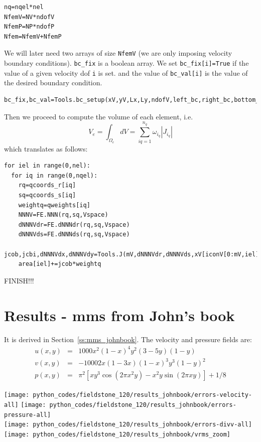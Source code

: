 \begin{lstlisting}
nq=nqel*nel
NfemV=NV*ndofV
NfemP=NP*ndofP
Nfem=NfemV+NfemP
\end{lstlisting}

We will later need two arrays of size \lstinline{NfemV} (we are only imposing
velocity boundary conditions). \lstinline{bc_fix} is a boolean array.
We set \lstinline{bc_fix[i]=True} if the value of a given velocity dof \lstinline{i} is set. 
and the value of \lstinline{bc_val[i]} is the value of the desired boundary condition.

\begin{lstlisting}
bc_fix,bc_val=Tools.bc_setup(xV,yV,Lx,Ly,ndofV,left_bc,right_bc,bottom_bc,top_bc)
\end{lstlisting}

Then we proceed to compute the volume of each element, i.e. 
\[
V_e = \int_{\Omega_e} dV = \sum_{iq=1}^{n_q} \omega_{i_q} |J_{i_q}|
\]
which translates as follows: 
\begin{lstlisting}
for iel in range(0,nel):
  for iq in range(0,nqel):
    rq=qcoords_r[iq]
    sq=qcoords_s[iq]
    weightq=qweights[iq]
    NNNV=FE.NNN(rq,sq,Vspace)
    dNNNVdr=FE.dNNNdr(rq,sq,Vspace)
    dNNNVds=FE.dNNNds(rq,sq,Vspace)
    jcob,jcbi,dNNNVdx,dNNNVdy=Tools.J(mV,dNNNVdr,dNNNVds,xV[iconV[0:mV,iel]],yV[iconV[0:mV,iel]])
    area[iel]+=jcob*weightq
\end{lstlisting}

FINISH!!!


\newpage
\section*{Results - mms from John's book}

It is derived in Section~\ref{ss:mms_johnbook}. The velocity and pressure fields are:
\begin{eqnarray}
u(x,y) &=& 1000 x^2(1-x)^4  y^2 (3-5y) (1-y) \\
v(x,y) &=& -1000 2x(1-3x) (1-x)^3  y^3(1-y)^2   \\
p(x,y) &=& \pi^2 [xy^3 \cos(2\pi x^2 y) - x^2y \sin(2\pi xy) ]+1/8
\end{eqnarray}

\begin{center}
\texttt{[image: python\_codes/fieldstone\_120/results\_johnbook/errors-velocity-all]}
\texttt{[image: python\_codes/fieldstone\_120/results\_johnbook/errors-pressure-all]}\\
\texttt{[image: python\_codes/fieldstone\_120/results\_johnbook/errors-divv-all]}
\texttt{[image: python\_codes/fieldstone\_120/results\_johnbook/vrms\_zoom]}
\end{center}






